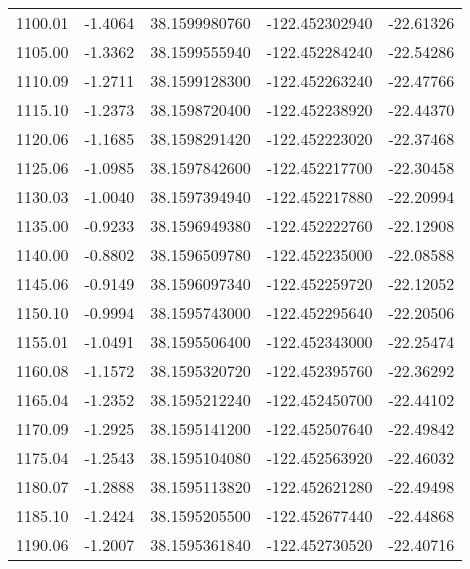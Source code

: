 \begin{scriptsize}
\begin{longtable}{p{2.5cm}p{2.5cm}p{3cm}p{3cm}p{2.5cm}}
          1100.01  & 	-1.4064 &               38.1599980760  &   -122.452302940   &	-22.61326 \\
          1105.00  & 	-1.3362 &               38.1599555940  &   -122.452284240   &	-22.54286 \\
          1110.09  & 	-1.2711 &               38.1599128300  &   -122.452263240   &	-22.47766 \\
          1115.10  & 	-1.2373 &               38.1598720400  &   -122.452238920   &	-22.44370 \\
          1120.06  & 	-1.1685 &               38.1598291420  &   -122.452223020   &	-22.37468 \\
          1125.06  & 	-1.0985 &               38.1597842600  &   -122.452217700   &	-22.30458 \\
          1130.03  & 	-1.0040 &               38.1597394940  &   -122.452217880   &	-22.20994 \\
          1135.00  & 	-0.9233 &               38.1596949380  &   -122.452222760   &	-22.12908 \\
          1140.00  & 	-0.8802 &               38.1596509780  &   -122.452235000   &	-22.08588 \\
          1145.06  & 	-0.9149 &               38.1596097340  &   -122.452259720   &	-22.12052 \\
          1150.10  & 	-0.9994 &               38.1595743000  &   -122.452295640   &	-22.20506 \\
          1155.01  & 	-1.0491 &               38.1595506400  &   -122.452343000   &	-22.25474 \\
          1160.08  & 	-1.1572 &               38.1595320720  &   -122.452395760   &	-22.36292 \\
          1165.04  & 	-1.2352 &               38.1595212240  &   -122.452450700   &	-22.44102 \\
          1170.09  & 	-1.2925 &               38.1595141200  &   -122.452507640   &	-22.49842 \\
          1175.04  & 	-1.2543 &               38.1595104080  &   -122.452563920   &	-22.46032 \\
          1180.07  & 	-1.2888 &               38.1595113820  &   -122.452621280   &	-22.49498 \\
          1185.10  & 	-1.2424 &               38.1595205500  &   -122.452677440   &	-22.44868 \\
          1190.06  & 	-1.2007 &               38.1595361840  &   -122.452730520   &	-22.40716 \\

\end{longtable}
\end{scriptsize}
